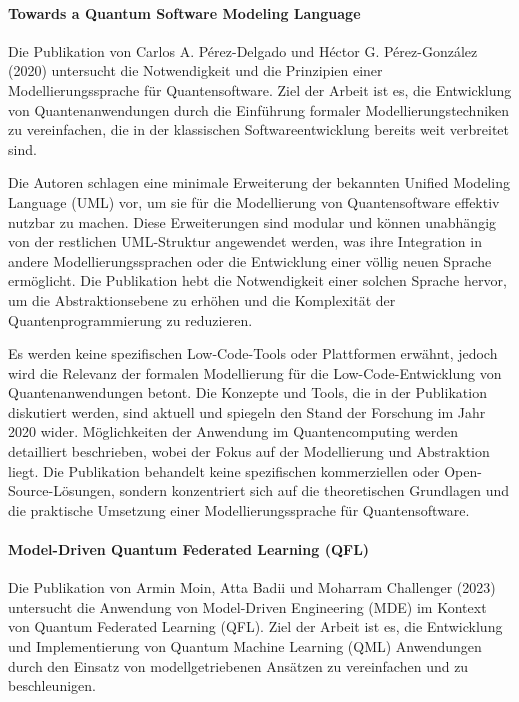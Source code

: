 \paragraph{Towards a Quantum Software Modeling Language}

Die Publikation von Carlos A. Pérez-Delgado und Héctor G. Pérez-González (2020) \cite{Perez-Delgado_2020} untersucht die Notwendigkeit und die 
Prinzipien einer Modellierungssprache für Quantensoftware. Ziel der Arbeit ist es, die Entwicklung von 
Quantenanwendungen durch die Einführung formaler Modellierungstechniken zu vereinfachen, die in der 
klassischen Softwareentwicklung bereits weit verbreitet sind.

Die Autoren schlagen eine minimale Erweiterung der bekannten Unified Modeling Language (UML) vor, um sie für die 
Modellierung von Quantensoftware effektiv nutzbar zu machen. Diese Erweiterungen sind modular und können unabhängig 
von der restlichen UML-Struktur angewendet werden, was ihre Integration in andere Modellierungssprachen 
oder die Entwicklung einer völlig neuen Sprache ermöglicht. Die Publikation hebt die Notwendigkeit einer solchen Sprache 
hervor, um die Abstraktionsebene zu erhöhen und die Komplexität der Quantenprogrammierung zu reduzieren.

Es werden keine spezifischen Low-Code-Tools oder Plattformen erwähnt, jedoch wird die Relevanz der 
formalen Modellierung für die Low-Code-Entwicklung von Quantenanwendungen betont. 
Die Konzepte und Tools, die in der Publikation diskutiert werden, sind aktuell und spiegeln den Stand der Forschung im Jahr 2020 wider. 
Möglichkeiten der Anwendung im Quantencomputing werden detailliert beschrieben, wobei der Fokus auf der Modellierung 
und Abstraktion liegt. Die Publikation behandelt keine spezifischen kommerziellen oder Open-Source-Lösungen, sondern 
konzentriert sich auf die theoretischen Grundlagen und die praktische Umsetzung einer Modellierungssprache für Quantensoftware.

\paragraph{Model-Driven Quantum Federated Learning (QFL)}

Die Publikation von Armin Moin, Atta Badii und Moharram Challenger (2023) \cite{Moin_2023} untersucht die Anwendung von 
Model-Driven Engineering (MDE) im Kontext von Quantum Federated Learning (QFL). Ziel der Arbeit ist es, die Entwicklung und 
Implementierung von Quantum Machine Learning (QML) Anwendungen durch den Einsatz von modellgetriebenen Ansätzen zu vereinfachen und zu beschleunigen.

